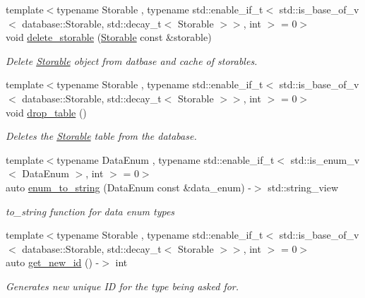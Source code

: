 \begin{DoxyCompactItemize}
{\footnotesize template$<$typename Storable , typename std\+::enable\+\_\+if\+\_\+t$<$ std\+::is\+\_\+base\+\_\+of\+\_\+v$<$ database\+::\+Storable, std\+::decay\+\_\+t$<$ Storable $>$$>$, int $>$  = 0$>$ }\\void \hyperlink{namespacedatabase_1_1utils_ac56bf4b6fc7b1481c84e42e6bb6db57b}{delete\+\_\+storable} (\hyperlink{classdatabase_1_1_storable}{Storable} const \&storable)
\begin{DoxyCompactList}\small\item\em Delete \hyperlink{classdatabase_1_1_storable}{Storable} object from datbase and cache of storables. \end{DoxyCompactList}\item 
{\footnotesize template$<$typename Storable , typename std\+::enable\+\_\+if\+\_\+t$<$ std\+::is\+\_\+base\+\_\+of\+\_\+v$<$ database\+::\+Storable, std\+::decay\+\_\+t$<$ Storable $>$$>$, int $>$  = 0$>$ }\\void \hyperlink{namespacedatabase_1_1utils_abfc70aa38436efb787b6c9f62941856d}{drop\+\_\+table} ()
\begin{DoxyCompactList}\small\item\em Deletes the \hyperlink{classdatabase_1_1_storable}{Storable} table from the database. \end{DoxyCompactList}\item 
{\footnotesize template$<$typename Data\+Enum , typename std\+::enable\+\_\+if\+\_\+t$<$ std\+::is\+\_\+enum\+\_\+v$<$ Data\+Enum $>$, int $>$  = 0$>$ }\\auto \hyperlink{namespacedatabase_1_1utils_a84e6b2503f6453631d2238ff3f9bc9e3}{enum\+\_\+to\+\_\+string} (Data\+Enum const \&data\+\_\+enum) -\/$>$ std\+::string\+\_\+view
\begin{DoxyCompactList}\small\item\em to\+\_\+string function for data enum types \end{DoxyCompactList}\item 
{\footnotesize template$<$typename Storable , typename std\+::enable\+\_\+if\+\_\+t$<$ std\+::is\+\_\+base\+\_\+of\+\_\+v$<$ database\+::\+Storable, std\+::decay\+\_\+t$<$ Storable $>$$>$, int $>$  = 0$>$ }\\auto \hyperlink{namespacedatabase_1_1utils_acab03452308a27ee3e8e5f30842d8ca8}{get\+\_\+new\+\_\+id} () -\/$>$ int
\begin{DoxyCompactList}\small\item\em Generates new unique ID for the type being asked for. \end{DoxyCompactList}\item 

\end{DoxyCompactItemize}
